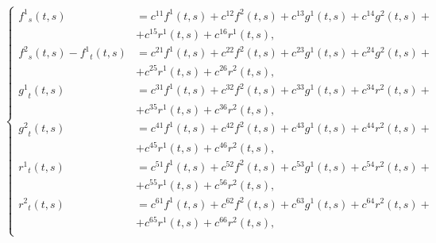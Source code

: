 \begin{equation}
\left\{
\begin{aligned}
{f^1}_s(t,s) &= c^{11}{f^1}(t,s)+c^{12}{f^2}(t,s)+c^{13}{g^{1}}(t,s)+c^{14}{g^{2}}(t,s)+
\\& +c^{15}{r^{1}}(t,s) +c^{16}{r^{1}}(t,s), \\
{f^2}_s(t,s) - {f^1}_t(t,s)&= c^{21}{f^1}(t,s)+c^{22}{f^2}(t,s)+c^{23}{g^{1}}(t,s)+c^{24}{g^{2}}(t,s)+
\\& +c^{25}{r^{1}}(t,s)+c^{26}{r^{2}}(t,s),\\
{g^{1}}_t(t,s) &= c^{31}{f^1}(t,s)+c^{32}{f^2}(t,s)+c^{33}{g^{1}}(t,s)+c^{34}{r^{2}}(t,s)+
\\& +c^{35}{r^{1}}(t,s)+c^{36}{r^{2}}(t,s),\\
{g^{2}}_t(t,s) &= c^{41}{f^1}(t,s)+c^{42}{f^2}(t,s)+c^{43}{g^{1}}(t,s)+c^{44}{r^{2}}(t,s)+
\\& +c^{45}{r^{1}}(t,s)+c^{46}{r^{2}}(t,s),\\
{r^{1}}_t(t,s) &= c^{51}{f^1}(t,s)+c^{52}{f^2}(t,s)+c^{53}{g^{1}}(t,s)+c^{54}{r^{2}}(t,s)+
\\& +c^{55}{r^{1}}(t,s)+c^{56}{r^{2}}(t,s),\\
{r^{2}}_t(t,s) &= c^{61}{f^1}(t,s)+c^{62}{f^2}(t,s)+c^{63}{g^{1}}(t,s)+c^{64}{r^{2}}(t,s)+
\\& +c^{65}{r^{1}}(t,s)+c^{66}{r^{2}}(t,s),\\
\end{aligned}
\right. \label{eq:tsar:6.2}
\end{equation}


